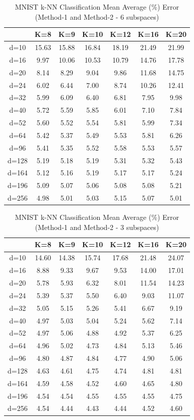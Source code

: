 \begin{table}[H]
\centering
\label{tab:table8}
\begin{tabular}{|c|c|c|c|c|c|c|}
\hline
& K=8 & K=9 & K=10 & K=12 & K=16 & K=20 \\
\hline
d=10 & 15.63 & 15.88 & 16.84 & 18.19 & 21.49 & 21.99 \\
d=16 & 9.97 & 10.06 & 10.53 & 10.79 & 14.76 & 17.78 \\
d=20 & 8.14 & 8.29 & 9.04 & 9.86 & 11.68 & 14.75 \\
d=24 & 6.02 & 6.44 & 7.00 & 8.74 & 10.26 & 12.41 \\
d=32 & 5.99 & 6.09 & 6.40 & 6.81 & 7.95 & 9.98 \\
d=40 & 5.72 & 5.59 & 5.85 & 6.01 & 7.10 & 7.84 \\
d=52 & 5.60 & 5.52 & 5.54 & 5.81 & 5.99 & 7.34 \\
d=64 & 5.42 & 5.37 & 5.49 & 5.53 & 5.81 & 6.26 \\
d=96 & 5.41 & 5.35 & 5.52 & 5.58 & 5.53 & 5.57 \\
d=128 & 5.19 & 5.18 & 5.19 & 5.31 & 5.32 & 5.43 \\
d=164 & 5.12 & 5.16 & 5.19 & 5.17 & 5.17 & 5.24 \\
d=196 & 5.09 & 5.07 & 5.06 & 5.08 & 5.08 & 5.21 \\
d=256 & 4.98 & 5.01 & 5.03 & 5.15 & 5.07 & 5.01 \\
\hline
\end{tabular}
\caption{MNIST k-NN Classification Mean Average (\%) Error (Method-1 and Method-2 - 6 subspaces)}
\end{table}

\begin{table}[H]
\centering
\label{tab:table9}
\begin{tabular}{|c|c|c|c|c|c|c|}
\hline
& K=8 & K=9 & K=10 & K=12 & K=16 & K=20 \\
\hline
d=10 & 14.60 & 14.38 & 15.74 & 17.68 & 21.48 & 24.07 \\
d=16 & 8.88 & 9.33 & 9.67 & 9.53 & 14.00 & 17.01 \\
d=20 & 5.78 & 5.93 & 6.32 & 8.01 & 11.54 & 14.23 \\
d=24 & 5.39 & 5.37 & 5.50 & 6.40 & 9.03 & 11.07 \\
d=32 & 5.05 & 5.15 & 5.26 & 5.41 & 6.67 & 9.19 \\
d=40 & 4.97 & 5.03 & 5.04 & 5.24 & 5.62 & 7.14 \\
d=52 & 4.97 & 5.06 & 4.88 & 4.92 & 5.37 & 6.25 \\
d=64 & 4.96 & 5.02 & 4.73 & 4.84 & 5.13 & 5.46 \\
d=96 & 4.80 & 4.87 & 4.84 & 4.77 & 4.90 & 5.06 \\
d=128 & 4.63 & 4.61 & 4.75 & 4.74 & 4.81 & 4.81 \\
d=164 & 4.59 & 4.58 & 4.52 & 4.60 & 4.65 & 4.80 \\
d=196 & 4.54 & 4.54 & 4.55 & 4.55 & 4.55 & 4.75 \\
d=256 & 4.54 & 4.44 & 4.43 & 4.44 & 4.52 & 4.60 \\
\hline
\end{tabular}
\caption{MNIST k-NN Classification Mean Average (\%) Error (Method-1 and Method-2 - 3 subspaces)}
\end{table}

